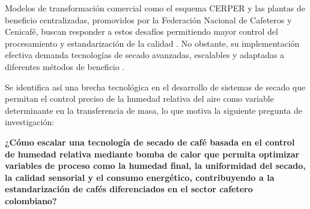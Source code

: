 Modelos de transformación comercial como el esquema CERPER y las plantas de beneficio 
centralizadas, promovidos por la Federación Nacional de Cafeteros y Cenicafé, buscan 
responder a estos desafíos permitiendo mayor control del procesamiento y estandarización 
de la calidad \cite{khathir_drying_2024, konopatzki_price_2019}. No obstante, su implementación efectiva demanda tecnologías de secado 
avanzadas, escalables y adaptadas a diferentes métodos de beneficio \cite{fauzi_influence_2024, dzaky_activation_2022}.

Se identifica así una brecha tecnológica en el desarrollo de sistemas de secado que 
permitan el control preciso de la humedad relativa del aire como variable determinante 
en la transferencia de masa, lo que motiva la siguiente pregunta de investigación:

\textbf{¿Cómo escalar una tecnología de secado de café basada en el control de humedad 
relativa mediante bomba de calor que permita optimizar variables de proceso como la 
humedad final, la uniformidad del secado, la calidad sensorial y el consumo energético, 
contribuyendo a la estandarización de cafés diferenciados en el sector cafetero 
colombiano?}